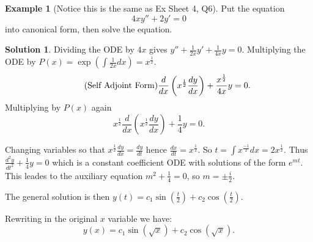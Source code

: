 \documentclass{article}
\theoremstyle{plain}
\theoremstyle{definition}
\newtheorem{exmp}{Example}[section]
\newtheorem*{sol}{Solution}
\numberwithin{equation}{section}
\begin{document}
\begin{tcolorbox}
    \begin{exmp}[Notice this is the same as Ex Sheet 4, Q6]
        Put the equation
        \[ 4xy'' + 2y' = 0 \]
        into canonical form, then solve the equation.
    \end{exmp}
    \begin{sol}
        Dividing the ODE by $4x$ gives $y'' + \frac{1}{2x}y' + \frac{1}{4x}y = 0$.
        Multiplying the ODE by $P(x)=\exp\left(\int \frac{1}{2x} dx \right) = x^{\frac{1}{2}}$.
        \begin{equation}\tag{\text{Self Adjoint Form}}
            \frac{d}{dx} \left( x^{\frac{1}{2}} \frac{dy}{dx} \right) + \frac{x^{\frac{1}{2}}}{4x} y = 0.
        \end{equation}
        Multiplying by $P(x)$ again
        \[ x^{\frac{1}{2}} \frac{d}{dx}\left( x^{\frac{1}{2}} \frac{dy}{dx} \right) + \frac{1}{4}y = 0. \]

        Changing variables so that $x^{\frac{1}{2}}\frac{dy}{dx} =\frac{dy}{dt}$ hence $\frac{dx}{dt} = x^{\frac{1}{2}}$. So $t = \int x^{\frac{-1}{2}} dx = 2x^{\frac{1}{2}}$. Thus $\frac{d^2y}{dt^2} + \frac{1}{4}y = 0$ which is a constant coefficient ODE with solutions of the form $e^{mt}$. This leades to the auxiliary equation $m^2 + \frac{1}{4} = 0$, so $m = \pm \frac{i}{2} $.

        The general solution is then $y(t) = c_1\sin\left(\frac{t}{2}\right) + c_2\cos\left(\frac{t}{2}\right).$

        Rewriting in the original $x$ variable we have:
        \[ y(x) = c_1\sin(\sqrt{x}) + c_2\cos(\sqrt{x}). \]
    \end{sol}
\end{tcolorbox}
\end{document}
